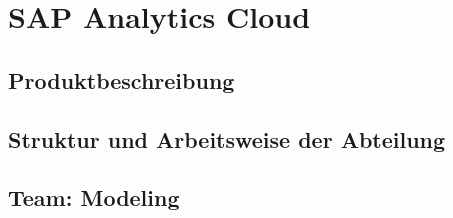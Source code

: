 \section{SAP Analytics Cloud}\label{sec:kaptiel}

\subsection{Produktbeschreibung}

\subsection{Struktur und Arbeitsweise der Abteilung}
\subsection{Team: Modeling}
